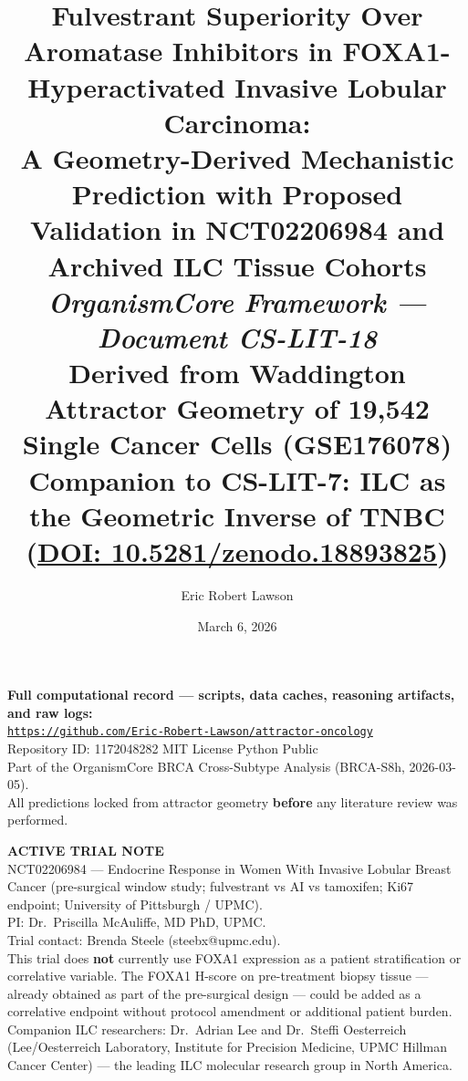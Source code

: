 \documentclass[12pt, a4paper]{article}
\title{
    \vspace{-1em}
    \textbf{Fulvestrant Superiority Over Aromatase
    Inhibitors in FOXA1-Hyperactivated Invasive
    Lobular Carcinoma:}\\[0.5em]
    \large A Geometry-Derived Mechanistic Prediction
    with Proposed Validation in NCT02206984 and
    Archived ILC Tissue Cohorts\\[0.4em]
    \normalsize \textit{OrganismCore Framework ---
    Document CS-LIT-18}\\[0.3em]
    \small Derived from Waddington Attractor Geometry
    of 19,542 Single Cancer Cells (GSE176078)\\[0.3em]
    \small Companion to CS-LIT-7: ILC as the Geometric
    Inverse of TNBC
    (\href{https://doi.org/10.5281/zenodo.18893825}
    {DOI: 10.5281/zenodo.18893825})
}
\author[1]{Eric Robert Lawson}
\affil[1]{
    OrganismCore\\
    \href{mailto:OrganismCore@proton.me}
         {OrganismCore@proton.me}\\
    ORCID:
    \href{https://orcid.org/0009-0002-0414-6544}
         {0009-0002-0414-6544}
}
\date{March 6, 2026}
\begin{document}

\maketitle
\thispagestyle{fancy}

\begin{center}
\colorbox{repobox}{
\begin{minipage}{0.88\textwidth}
\vspace{0.5em}
\centering
\textbf{Full computational record --- scripts, data
caches, reasoning artifacts, and raw logs:}\\[0.4em]
\href{https://github.com/Eric-Robert-Lawson/attractor-oncology}
{\texttt{https://github.com/Eric-Robert-Lawson/attractor-oncology}}
\\[0.3em]
\small Repository ID: 1172048282 \textbar{}
MIT License \textbar{}
Python \textbar{}
Public\\[0.2em]
Part of the OrganismCore BRCA Cross-Subtype Analysis
(BRCA-S8h, 2026-03-05).\\
All predictions locked from attractor geometry
\textbf{before} any literature review was performed.
\vspace{0.5em}
\end{minipage}}
\end{center}

\vspace{0.8em}

\begin{center}
\colorbox{urgentbox}{
\begin{minipage}{0.88\textwidth}
\vspace{0.5em}
\centering
\textbf{ACTIVE TRIAL NOTE}\\[0.4em]
\small
NCT02206984 --- Endocrine Response in Women With
Invasive Lobular Breast Cancer (pre-surgical window
study; fulvestrant vs AI vs tamoxifen; Ki67 endpoint;
University of Pittsburgh / UPMC).\\[0.3em]
PI: Dr.\ Priscilla McAuliffe, MD PhD, UPMC.\\
Trial contact: Brenda Steele (steebx@upmc.edu).\\[0.3em]
This trial does \textbf{not} currently use FOXA1
expression as a patient stratification or correlative
variable. The FOXA1 H-score on pre-treatment biopsy
tissue --- already obtained as part of the pre-surgical
design --- could be added as a correlative endpoint
without protocol amendment or additional patient burden.\\[0.3em]
Companion ILC researchers: Dr.\ Adrian Lee and
Dr.\ Steffi Oesterreich (Lee/Oesterreich Laboratory,
Institute for Precision Medicine, UPMC Hillman Cancer
Center) --- the leading ILC molecular research group
in North America.
\vspace{0.5em}
\end{minipage}}
\end{center}
\end{document}

